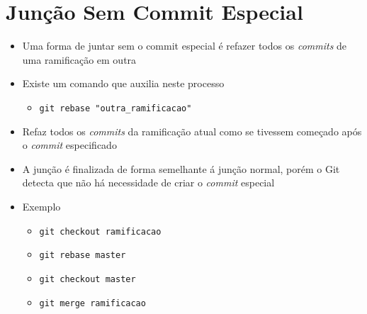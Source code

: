 \documentclass{beamer}
\newenvironment{slide}{\begin{frame}{\insertsection}}{\end{frame}}
\begin{document}
\section{Junção Sem Commit Especial}
\begin{slide}
    \begin{itemize}
        \item Uma forma de juntar sem o commit especial é refazer todos os
            \emph{commits} de uma ramificação em outra
        \pause
        \item Existe um comando que auxilia neste processo
        \begin{itemize}
            \pause
            \item \texttt{git rebase "outra\_ramificacao"}
        \end{itemize}
        \pause
        \item Refaz todos os \emph{commits} da ramificação atual como se
            tivessem começado após o \emph{commit} especificado
        \pause
        \item A junção é finalizada de forma semelhante á junção normal, porém o
            Git detecta que não há necessidade de criar o \emph{commit} especial
        \pause
        \item Exemplo
        \begin{itemize}
            \pause
            \item \texttt{git checkout ramificacao}
            \pause
            \item \texttt{git rebase master}
            \pause
            \item \texttt{git checkout master}
            \pause
            \item \texttt{git merge ramificacao}
        \end{itemize}
    \end{itemize}
\end{slide}
\end{document}
